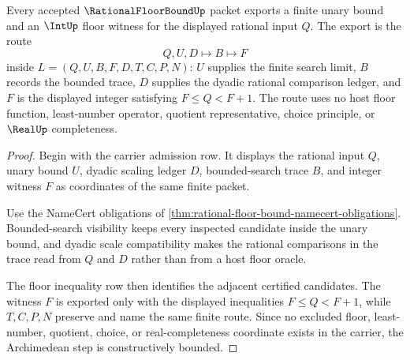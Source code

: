 \begin{theorem}
\label{thm:rational-floor-bound-archimedean-step}
Every accepted $\RationalFloorBoundUp$ packet exports a finite unary bound and an $\IntUp$ floor witness for the displayed rational input $Q$. The export is the route
$$
Q,U,D \longmapsto B \longmapsto F
$$
inside $L=(Q,U,B,F,D,T,C,P,N)$: $U$ supplies the finite search limit, $B$ records the bounded trace, $D$ supplies the dyadic rational comparison ledger, and $F$ is the displayed integer satisfying $F \leq Q < F+1$. The route uses no host floor function, least-number operator, quotient representative, choice principle, or $\RealUp$ completeness.
\end{theorem}
\begin{proof}
Begin with the carrier admission row. It displays the rational input $Q$, unary bound $U$, dyadic scaling ledger $D$, bounded-search trace $B$, and integer witness $F$ as coordinates of the same finite packet.

Use the NameCert obligations of \autoref{thm:rational-floor-bound-namecert-obligations}. Bounded-search visibility keeps every inspected candidate inside the unary bound, and dyadic scale compatibility makes the rational comparisons in the trace read from $Q$ and $D$ rather than from a host floor oracle.

The floor inequality row then identifies the adjacent certified candidates. The witness $F$ is exported only with the displayed inequalities $F \leq Q < F+1$, while $T,C,P,N$ preserve and name the same finite route. Since no excluded floor, least-number, quotient, choice, or real-completeness coordinate exists in the carrier, the Archimedean step is constructively bounded.
\end{proof}


\begin{closurestatus}{\RationalFloorBoundUp}
  \theoryclosure{\seedClosure}
  \formalstatus{\unformalizedV}
\end{closurestatus}
